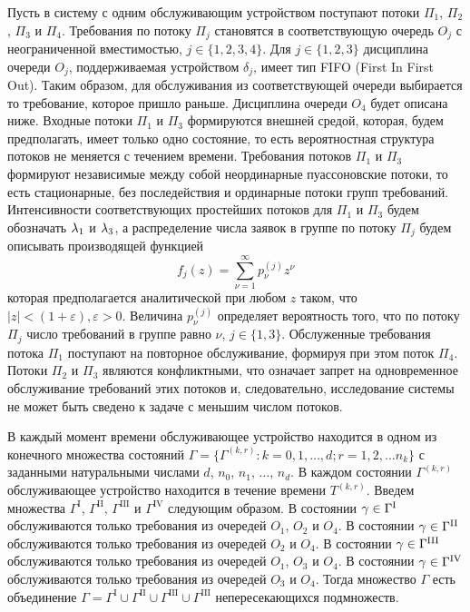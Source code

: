 \documentclass[a4paper,12pt,russian]{extarticle}
\newcommand{\G}{\Gamma}
\newcommand{\ga}[1]{\Gamma^{\left( #1 \right)} }
\newcommand{\Tt}[1]{T^{\left( #1 \right)} }
\begin{document}
Пусть в систему с одним обслуживающим устройством поступают потоки $\Pi_1$, $\Pi_2$, $\Pi_3$  и $\Pi_4$. Требования по потоку $\Pi_j$ становятся в соответствующую очередь $O_j$ с неограниченной вместимостью, $j\in \{1, 2, 3, 4\}$. Для $j \in \{1, 2, 3\}$ дисциплина очереди $O_j$, поддерживаемая устройством $\delta_j$, имеет тип FIFO (First In First Out). Таким образом, для обслуживания из соответствующей очереди выбирается то требование, которое пришло раньше. Дисциплина очереди $O_4$ будет описана ниже. Входные потоки $\Pi_1$ и $\Pi_3$ формируются внешней средой, которая, будем предполагать, имеет только одно состояние, то есть вероятностная структура потоков не меняется с течением времени. Требования потоков $\Pi_1$ и $\Pi_3$ формируют независимые между собой неординарные пуассоновские потоки, то есть  стационарные, без последействия и ординарные потоки групп требований. Интенсивности соответствующих простейших потоков для $\Pi_1$ и $\Pi_3$ будем обозначать $\lambda_1$ и $\lambda_3$, а распределение числа заявок в группе по потоку $\Pi_j$ будем описывать производящей функцией
\begin{equation}
f_j(z) = \sum_{\nu=1}^{\infty} p_{\nu}^{(j)} z ^{\nu}
\label{GeneratingFunc}
\end{equation}
которая предполагается аналитической при любом $z$ таком, что $|z|<(1+\varepsilon), \varepsilon > 0$. Величина $p_{\nu}^{(j)}$ определяет вероятность того, что по потоку $\Pi_j$ число требований в группе равно $\nu$, $j\in \{1,3\}$. Обслуженные требования потока $\Pi_1$ поступают на повторное обслуживание, формируя при этом поток $\Pi_4$. Потоки $\Pi_2$ и $\Pi_3$ являются конфликтными, что означает запрет на одновременное обслуживание требований этих потоков и, следовательно, исследование системы не может быть сведено к задаче с меньшим числом потоков. 
 
 В каждый момент времени обслуживающее устройство находится в одном из конечного множества состояний $\Gamma=\{\G^{(k,r)} \colon k=0,1,\ldots,d; r=1,2,\ldots n_k\}$ с заданными натуральными числами $d$, $n_0$, $n_1$, $\ldots$, $n_d$. В каждом состоянии $\ga{k,r}$ обслуживающее устройство находится в течение времени $\Tt{k,r}$. Введем множества $\G^{\mathrm{I}}$, $\G^{\mathrm{II}}$, $\G^{\mathrm{III}}$ и $\G^{\mathrm{IV}}$ следующим образом. В состоянии $\gamma \in \G^{\mathrm{\Rmnum{1}}}$ обслуживаются только требования из очередей $O_1$, $O_2$ и $O_4$.
В состоянии $\gamma \in \G^{\mathrm{\Rmnum{2}}}$ обслуживаются только требования из очередей $O_2$ и $O_4$.
В состоянии $\gamma \in \G^{\mathrm{\Rmnum{3}}}$ обслуживаются только требования из очередей $O_1$, $O_3$ и $O_4$.
В состоянии $\gamma \in \G^{\mathrm{\Rmnum{4}}}$ обслуживаются только требования из очередей $O_3$ и $O_4$.
Тогда множество $\G$ есть объединение $\G = \G^{\mathrm{I}} \cup \G^{\mathrm{II}} \cup \G^{\mathrm{III}} \cup \G^{\mathrm{III}}$ непересекающихся подмножеств. 
\end{document}
